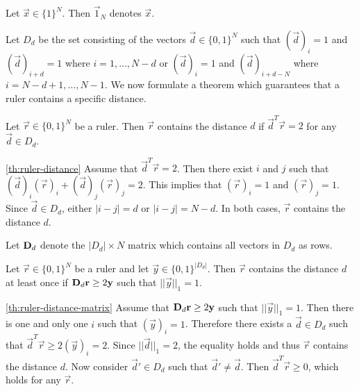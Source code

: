 \documentclass[a4paper, openany, oneside]{memoir}
\begin{document}
\begin{blockDefinition}
    Let $\vec{x} \in \{1\}^N$. Then $\vec{1}_N$ denotes $\vec{x}$.
\end{blockDefinition}

Let $D_d$ be the set consisting of the vectors $\vec{d} \in \{0,1\}^N$ such that $(\vec{d})_i=1$ and $(\vec{d})_{i+d}=1$ where $i = 1,\ldots,N-d$ or $(\vec{d})_i=1$ and $(\vec{d})_{i+d-N}$ where $i = N-d+1,\ldots,N-1$.
We now formulate a theorem which guarantees that a ruler contains a specific distance.

\begin{blockTheorem} \label{th:ruler-distance}\nolinebreak
    Let $\vec{r} \in \{0,1\}^N$ be a ruler. Then $\vec{r}$ contains the distance $d$ if $\vec{d}^T \vec{r} = 2$ for any $\vec{d} \in D_d$.\nolinebreak
\end{blockTheorem}

\begin{blockProofTheorem}{\ref{th:ruler-distance}}
    Assume that $\vec{d}^T\vec{r} = 2$. Then there exist $i$ and $j$ such that $(\vec{d})_i (\vec{r})_i + (\vec{d})_j (\vec{r})_j = 2$. This implies that $(\vec{r})_i = 1$ and $(\vec{r})_j = 1$. Since $\vec{d} \in D_d$, either $|i-j|=d$ or $|i-j| = N-d$. In both cases, $\vec{r}$ contains the distance $d$. 
\end{blockProofTheorem}

Let $\boldsymbol{\mathbf{D}}_d$ denote the $|D_d| \times N$ matrix which contains all vectors in $D_d$ as rows.

\begin{blockTheorem} \label{th:ruler-distance-matrix}\nolinebreak
    Let $\vec{r} \in \{0,1\}^N$ be a ruler and let $\vec{y} \in \{0,1\}^{|D_d|}$. Then $\vec{r}$ contains the distance $d$ at least once if $\boldsymbol{\mathbf{D}}_d \boldsymbol{\mathbf{r}} \ge 2\boldsymbol{\mathbf{y}}$ such that $||\vec{y}||_1 = 1$.
\end{blockTheorem}

\begin{blockProofTheorem}{\ref{th:ruler-distance-matrix}}
    Assume that $\boldsymbol{\mathbf{D}}_d \boldsymbol{\mathbf{r}} \ge 2 \boldsymbol{\mathbf{y}}$ such that $||\vec{y}||_1 = 1$. Then there is one and only one $i$ such that $(\vec{y})_i=1$. Therefore there exists a $\vec{d} \in D_d$ such that $\vec{d}^T \vec{r} \ge 2 (\vec{y})_i = 2$. Since $||\vec{d}||_1=2$, the equality holds and thus $\vec{r}$ contains the distance $d$. Now consider $\vec{d}' \in D_d$ such that $\vec{d}' \neq \vec{d}$. Then $\vec{d}^T \vec{r} \ge 0$, which holds for any $\vec{r}$.  
\end{blockProofTheorem}
\end{document}
